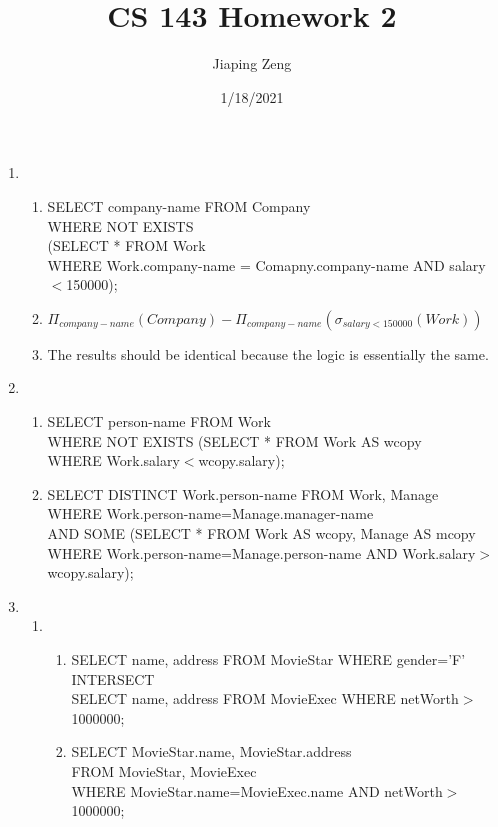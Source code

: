 \documentclass{article}
\title{CS 143 Homework 2}
\date{1/18/2021}
\author{Jiaping Zeng}
\begin{document}
\maketitle

\begin{enumerate}
    \item
          \begin{enumerate}
              \item SELECT company-name FROM Company\\WHERE NOT EXISTS\\(SELECT * FROM Work\\WHERE Work.company-name = Comapny.company-name AND salary$<$150000);
              \item $\Pi_{company-name}(Company)-\Pi_{company-name}(\sigma_{salary<150000}(Work))$
              \item The results should be identical because the logic is essentially the same.
          \end{enumerate}
    \item
          \begin{enumerate}
              \item SELECT person-name FROM Work\\WHERE NOT EXISTS (SELECT * FROM Work AS wcopy\\WHERE Work.salary$<$wcopy.salary);
              \item SELECT DISTINCT Work.person-name FROM Work, Manage\\WHERE Work.person-name=Manage.manager-name\\AND SOME (SELECT * FROM Work AS wcopy, Manage AS mcopy\\WHERE Work.person-name=Manage.person-name AND Work.salary$>$wcopy.salary);
          \end{enumerate}
    \item
          \begin{enumerate}
              \item
                    \begin{enumerate}
                        \item SELECT name, address FROM MovieStar WHERE gender='F'\\INTERSECT\\SELECT name, address FROM MovieExec WHERE netWorth$>$1000000;
                        \item SELECT MovieStar.name, MovieStar.address\\FROM MovieStar, MovieExec\\WHERE MovieStar.name=MovieExec.name AND netWorth$>$1000000;

\end{enumerate}
\end{enumerate}
\end{enumerate}
\end{document}
